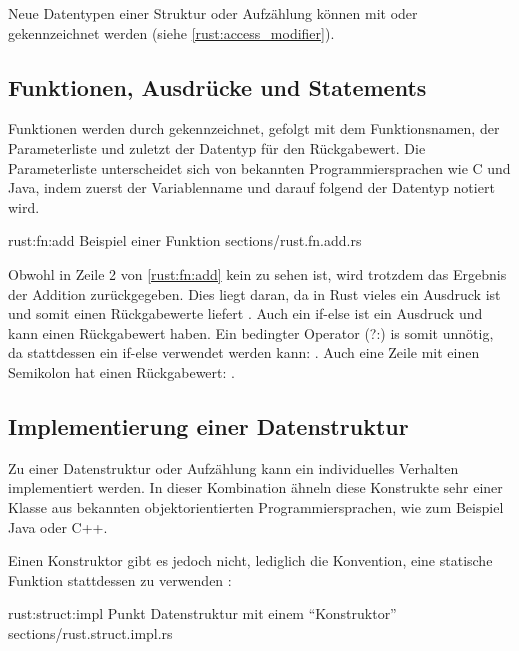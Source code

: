Neue Datentypen einer Struktur oder Aufzählung können mit  oder  gekennzeichnet werden (siehe \autoref{rust:access_modifier}).



\subsection{Funktionen, Ausdrücke und Statements}

Funktionen werden durch  gekennzeichnet, gefolgt mit dem Funktionsnamen, der Parameterliste und zuletzt der Datentyp für den Rückgabewert.
Die Parameterliste unterscheidet sich von bekannten Programmiersprachen wie C und Java, indem zuerst der Variablenname und darauf folgend der Datentyp notiert wird.

\rustcinclude
	{rust:fn:add}
	{Beispiel einer Funktion}
	{sections/rust.fn.add.rs}
	
Obwohl in Zeile 2 von \autoref{rust:fn:add} kein  zu sehen ist, wird trotzdem das Ergebnis der Addition zurückgegeben.
Dies liegt daran, da in Rust vieles ein Ausdruck ist und somit einen Rückgabewerte liefert \cite{rust:book:statements}.
Auch ein if-else ist ein Ausdruck und kann einen Rückgabewert haben.
Ein bedingter Operator (?:) is somit unnötig, da stattdessen ein if-else verwendet werden kann: . 
Auch eine Zeile mit einen Semikolon hat einen Rückgabewert: \rustcinline{()}. 

\subsection{Implementierung einer Datenstruktur}

Zu einer Datenstruktur oder Aufzählung kann ein individuelles Verhalten implementiert werden.
In dieser Kombination ähneln diese Konstrukte sehr einer Klasse aus bekannten objektorientierten Programmiersprachen, wie zum Beispiel Java oder C++. 

Einen Konstruktor gibt es jedoch nicht, lediglich die Konvention, eine statische Funktion  stattdessen zu verwenden \cite{rust:book:constructors}:

\rustcinclude
	{rust:struct:impl}
	{Punkt Datenstruktur mit einem \enquote{Konstruktor}}
	{sections/rust.struct.impl.rs}
	
